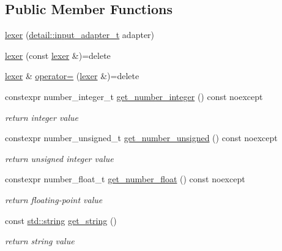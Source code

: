 \subsection*{Public Member Functions}
\begin{DoxyCompactItemize}
\item 
\hyperlink{classnlohmann_1_1detail_1_1lexer_a0d7de7b99bc839ea9a39dd738d05d89c}{lexer} (\hyperlink{namespacenlohmann_1_1detail_ae132f8cd5bb24c5e9b40ad0eafedf1c2}{detail\+::input\+\_\+adapter\+\_\+t} adapter)
\item 
\hyperlink{classnlohmann_1_1detail_1_1lexer_a2e8ce2a0d266d148b69dfbcc2e4ad71a}{lexer} (const \hyperlink{classnlohmann_1_1detail_1_1lexer}{lexer} \&)=delete
\item 
\hyperlink{classnlohmann_1_1detail_1_1lexer}{lexer} \& \hyperlink{classnlohmann_1_1detail_1_1lexer_a33e97dee7c5faf1b36aff5b74a6c8f55}{operator=} (\hyperlink{classnlohmann_1_1detail_1_1lexer}{lexer} \&)=delete
\item 
constexpr number\+\_\+integer\+\_\+t \hyperlink{classnlohmann_1_1detail_1_1lexer_afa338d17c0a7e834c73104258a2c8ced}{get\+\_\+number\+\_\+integer} () const noexcept
\begin{DoxyCompactList}\small\item\em return integer value \end{DoxyCompactList}\item 
constexpr number\+\_\+unsigned\+\_\+t \hyperlink{classnlohmann_1_1detail_1_1lexer_a56640fb92293e0c17742ca3c814d74d6}{get\+\_\+number\+\_\+unsigned} () const noexcept
\begin{DoxyCompactList}\small\item\em return unsigned integer value \end{DoxyCompactList}\item 
constexpr number\+\_\+float\+\_\+t \hyperlink{classnlohmann_1_1detail_1_1lexer_ac013af35a21e9387993b19da5b3e0ae2}{get\+\_\+number\+\_\+float} () const noexcept
\begin{DoxyCompactList}\small\item\em return floating-\/point value \end{DoxyCompactList}\item 
const \hyperlink{namespacenlohmann_1_1detail_a90aa5ef615aa8305e9ea20d8a947980fab45cffe084dd3d20d928bee85e7b0f21}{std\+::string} \hyperlink{classnlohmann_1_1detail_1_1lexer_a61e3bf22aa79c402f26670560b6198b0}{get\+\_\+string} ()
\begin{DoxyCompactList}\small\item\em return string value \end{DoxyCompactList}\item 

\end{DoxyCompactItemize}
